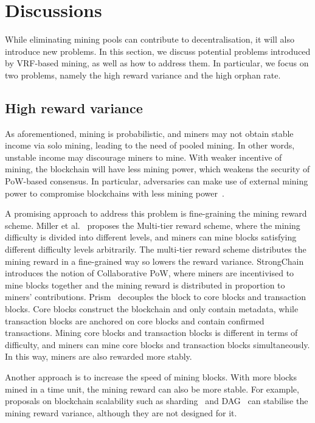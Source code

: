 \section{Discussions}
\label{sec:discussions}

While eliminating mining pools can contribute to decentralisation, it will also introduce new problems.
In this section, we discuss potential problems introduced by VRF-based mining, as well as how to address them.
In particular, we focus on two problems, namely the high reward variance and the high orphan rate.

\subsection{High reward variance}

As aforementioned, mining is probabilistic, and miners may not obtain stable income via solo mining, leading to the need of pooled mining.
In other words, unstable income may discourage miners to mine.
With weaker incentive of mining, the blockchain will have less mining power, which weakens the security of PoW-based consensus.
In particular, adversaries can make use of external mining power to compromise blockchains with less mining power~\cite{hansucker}.

A promising approach to address this problem is fine-graining the mining reward scheme.
Miller et al.~\cite{miller2015nonoutsourceable} proposes the Multi-tier reward scheme, where the mining difficulty is divided into different levels, and miners can mine blocks satisfying different difficulty levels arbitrarily.
The multi-tier reward scheme distributes the mining reward in a fine-grained way so lowers the reward variance.
StrongChain~\cite{szalachowski2019strongchain} introduces the notion of Collaborative PoW, where miners are incentivised to mine blocks together and the mining reward is distributed in proportion to miners' contributions.
Prism~\cite{bagaria2019prism} decouples the block to core blocks and transaction blocks.
Core blocks construct the blockchain and only contain metadata, while transaction blocks are anchored on core blocks and contain confirmed transactions.
Mining core blocks and transaction blocks is different in terms of difficulty, and miners can mine core blocks and transaction blocks simultaneously.
In this way, miners are also rewarded more stably.

Another approach is to increase the speed of mining blocks.
With more blocks mined in a time unit, the mining reward can also be more stable.
For example, proposals on blockchain scalability such as sharding~\cite{wang2019monoxide} and DAG~\cite{li2018scaling} can stabilise the mining reward variance, although they are not designed for it.





